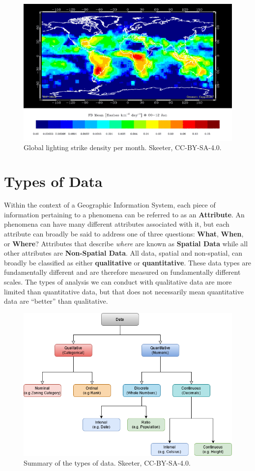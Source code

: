 \documentclass[
]{book}
\begin{document}
\begin{figure}
\includegraphics[width=0.75\linewidth]{images/03-lightning-density} \caption{Global lighting strike density per month. Skeeter, CC-BY-SA-4.0.}\label{fig:3-lightning-density}
\end{figure}

\section{Types of Data}\label{types-of-data-1}

Within the context of a Geographic Information System, each piece of information pertaining to a phenomena can be referred to as an \textbf{Attribute}. An phenomena can have many different attributes associated with it, but each attribute can broadly be said to address one of three questions: \textbf{What}, \textbf{When}, or \textbf{Where}? Attributes that describe \emph{where} are known as \textbf{Spatial Data} while all other attributes are \textbf{Non-Spatial Data}. All data, spatial and non-spatial, can broadly be classified as either \textbf{qualitative} or \textbf{quantitative}. These data types are fundamentally different and are therefore measured on fundamentally different scales. The types of analysis we can conduct with qualitative data are more limited than quantitative data, but that does not necessarily mean quantitative data are ``better'' than qualitative.

\begin{figure}
\includegraphics[width=0.75\linewidth]{images/03-data-types} \caption{Summary of the types of data. Skeeter, CC-BY-SA-4.0.}\label{fig:3-data-types}
\end{figure}
\end{document}
